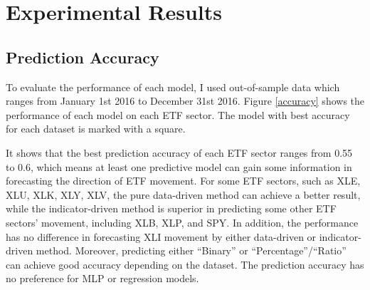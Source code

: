\documentclass[letterpaper]{article}
\begin{document}
\section{Experimental Results}

\subsection{Prediction Accuracy}
To evaluate the performance of each model, I used out-of-sample data which
ranges from January 1st 2016 to December 31st 2016. Figure \ref{accuracy}
shows the performance of each model on each ETF sector. The model with best
accuracy for each dataset is marked with a square.

It shows that the best prediction accuracy of each ETF sector ranges from
0.55 to 0.6, which means at least one predictive model can gain some
information in forecasting the direction of ETF movement. For some ETF sectors,
such as XLE, XLU, XLK, XLY, XLV, the pure data-driven method can achieve a
better result, while the indicator-driven method is superior in predicting some
other ETF sectors' movement, including XLB, XLP, and SPY. In addition, the
performance has no difference in forecasting XLI movement by either data-driven
or indicator-driven method. Moreover, predicting either “Binary” or
“Percentage”/“Ratio” can achieve good accuracy depending on the dataset. The
prediction accuracy has no preference for MLP or regression models.
\end{document}
